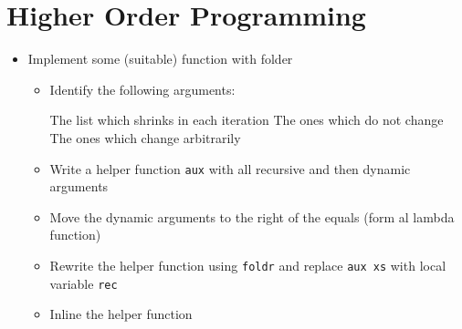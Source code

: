 
\section{Higher Order Programming}
\begin{itemize}
    \item Implement some (suitable) function with folder
        \begin{itemize}
            \item Identify the following arguments:
                \begin{itemize}
                     The list which shrinks in each iteration
                     The ones which do not change
                     The ones which change arbitrarily
                \end{itemize}
            \item Write a helper function \verb+aux+ with all recursive and then dynamic arguments
            \item Move the dynamic arguments to the right of the equals (form al lambda function)
            \item Rewrite the helper function using \verb+foldr+ and replace \verb+aux xs+ with local variable \verb+rec+
            \item Inline the helper function
        \end{itemize}
\end{itemize}

